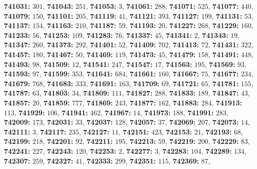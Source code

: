 \textsf{\bfseries 741031:} $301$, \textsf{\bfseries 741043:} $251$, \textsf{\bfseries 741053:} $3$, \textsf{\bfseries 741061:} $288$, \textsf{\bfseries 741071:} $525$, \textsf{\bfseries 741077:} $440$, \textsf{\bfseries 741079:} $150$, \textsf{\bfseries 741101:} $205$, \textsf{\bfseries 741119:} $41$, \textsf{\bfseries 741121:} $393$, \textsf{\bfseries 741127:} $199$, \textsf{\bfseries 741131:} $53$, \textsf{\bfseries 741137:} $154$, \textsf{\bfseries 741163:} $210$, \textsf{\bfseries 741187:} $59$, \textsf{\bfseries 741193:} $20$, \textsf{\bfseries 741227:} $268$, \textsf{\bfseries 741229:} $160$, \textsf{\bfseries 741233:} $56$, \textsf{\bfseries 741253:} $109$, \textsf{\bfseries 741283:} $76$, \textsf{\bfseries 741337:} $45$, \textsf{\bfseries 741341:} $2$, \textsf{\bfseries 741343:} $19$, \textsf{\bfseries 741347:} $260$, \textsf{\bfseries 741373:} $292$, \textsf{\bfseries 741401:} $52$, \textsf{\bfseries 741409:} $702$, \textsf{\bfseries 741413:} $72$, \textsf{\bfseries 741431:} $322$, \textsf{\bfseries 741457:} $180$, \textsf{\bfseries 741467:} $50$, \textsf{\bfseries 741469:} $119$, \textsf{\bfseries 741473:} $45$, \textsf{\bfseries 741479:} $158$, \textsf{\bfseries 741491:} $448$, \textsf{\bfseries 741493:} $98$, \textsf{\bfseries 741509:} $12$, \textsf{\bfseries 741541:} $247$, \textsf{\bfseries 741547:} $17$, \textsf{\bfseries 741563:} $195$, \textsf{\bfseries 741569:} $93$, \textsf{\bfseries 741593:} $97$, \textsf{\bfseries 741599:} $353$, \textsf{\bfseries 741641:} $684$, \textsf{\bfseries 741661:} $160$, \textsf{\bfseries 741667:} $75$, \textsf{\bfseries 741677:} $234$, \textsf{\bfseries 741679:} $768$, \textsf{\bfseries 741683:} $333$, \textsf{\bfseries 741691:} $163$, \textsf{\bfseries 741709:} $69$, \textsf{\bfseries 741721:} $65$, \textsf{\bfseries 741781:} $155$, \textsf{\bfseries 741787:} $63$, \textsf{\bfseries 741803:} $34$, \textsf{\bfseries 741809:} $111$, \textsf{\bfseries 741827:} $288$, \textsf{\bfseries 741833:} $189$, \textsf{\bfseries 741847:} $43$, \textsf{\bfseries 741857:} $20$, \textsf{\bfseries 741859:} $777$, \textsf{\bfseries 741869:} $243$, \textsf{\bfseries 741877:} $162$, \textsf{\bfseries 741883:} $284$, \textsf{\bfseries 741913:} $113$, \textsf{\bfseries 741929:} $106$, \textsf{\bfseries 741941:} $462$, \textsf{\bfseries 741967:} $14$, \textsf{\bfseries 741973:} $188$, \textsf{\bfseries 741991:} $283$, \textsf{\bfseries 742009:} $173$, \textsf{\bfseries 742031:} $33$, \textsf{\bfseries 742037:} $128$, \textsf{\bfseries 742057:} $37$, \textsf{\bfseries 742069:} $207$, \textsf{\bfseries 742073:} $14$, \textsf{\bfseries 742111:} $3$, \textsf{\bfseries 742117:} $235$, \textsf{\bfseries 742127:} $11$, \textsf{\bfseries 742151:} $423$, \textsf{\bfseries 742153:} $21$, \textsf{\bfseries 742193:} $68$, \textsf{\bfseries 742199:} $218$, \textsf{\bfseries 742201:} $92$, \textsf{\bfseries 742211:} $195$, \textsf{\bfseries 742213:} $59$, \textsf{\bfseries 742219:} $200$, \textsf{\bfseries 742229:} $83$, \textsf{\bfseries 742241:} $227$, \textsf{\bfseries 742243:} $120$, \textsf{\bfseries 742253:} $2$, \textsf{\bfseries 742277:} $3$, \textsf{\bfseries 742283:} $104$, \textsf{\bfseries 742289:} $134$, \textsf{\bfseries 742307:} $259$, \textsf{\bfseries 742327:} $41$, \textsf{\bfseries 742333:} $299$, \textsf{\bfseries 742351:} $115$, \textsf{\bfseries 742369:} $87$, 
